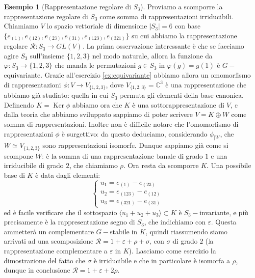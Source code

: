 \documentclass[11pt]{article}
\theoremstyle{plain}
\theoremstyle{definition}
\newtheorem{exmp}{Esempio}[section]
\theoremstyle{remark}
\newcommand{\C}{\mathbb{C}}
\DeclareMathOperator{\Ker}{Ker}
\DeclareMathOperator{\iso}{\simeq}
\begin{document}
\begin{exmp}[Rappresentazione regolare di $S_3$]
Proviamo a scomporre la rappresentazione regolare di $S_3$ come somma di rappresentazioni irriducibili.
Chiamiamo $V$ lo spazio vettoriale di dimensione $|S_3|=6$ con base $\{e_{(1)}, e_{(12)}, e_{(23)}, e_{(31)}, e_{(123)}, e_{(321)}\}$
su cui abbiamo la rappresentazione regolare $\mathcal{R}:S_3\to GL(V)$.\newline
La prima osservazione interessante è che se facciamo agire $S_3$ sull'insieme $\{1,2,3\}$ nel modo naturale, allora la funzione 
da $\varphi:S_3\to\{1,2,3\}$ che manda le permutazioni $g\in S_3$ in $\varphi(g) = g(1)$ è $G-$equivariante.
Grazie all'esercizio \ref{ex:equivariante} abbiamo allora un omomorfismo di rappresentazioni $\phi:V\to V_{\{1,2,3\}}$,
dove $V_{\{1,2,3\}} = \C^3$ è una rappresentazione che abbiamo già studiato: quella in cui $S_3$ permuta gli elementi della base canonica.\newline
Definendo $K = \Ker\phi$ abbiamo ora che $K$ è una sottorappresentazione di $V$, e dalla teoria che abbiamo sviluppato sappiamo di poter scrivere
$V = K\oplus W$ come somma di rappresentazioni. Inoltre non è difficile notare che l'omomorfismo di rappresentazioni $\phi$ è surgettivo:
da questo deduciamo, considerando $\phi_{|W}$, che $W\iso V_{\{1,2,3\}}$ sono rappresentazioni isomorfe. Dunque sappiamo già come si scompone $W$:
è la somma di una rappresentazione banale di grado $1$ e una irriducibile di grado $2$, che chiamiamo $\rho$.\newline
Ora resta da scomporre $K$. Una possibile base di $K$ è data dagli elementi:
\[\begin{cases}
u_1 = e_{(1)} - e_{(23)}\\
u_2 = e_{(123)} - e_{(12)}\\
u_3 = e_{(321)} - e_{(31)}
\end{cases}\]
ed è facile verificare che il sottospazio $\langle u_1+u_2+u_3\rangle\subset K$ è $S_3-$invariante, e più precisamente è la rappresentazione
segno di $S_3$, che indichiamo con $\varepsilon$. Questa ammetterà un complementare $G-$stabile in $K$, quindi riassumendo siamo arrivati ad una scomposizione
$\mathcal{R} = 1 + \varepsilon + \rho + \sigma$, con $\sigma$ di grado $2$ (la rappresentazione complementare a $\varepsilon$ in $K$).
Lasciamo come esercizio la dimostrazione del fatto che $\sigma$ è irriducibile e che in particolare è isomorfa a $\rho$, dunque in conclusione
$\mathcal{R} = 1 + \varepsilon + 2\rho$.
\end{exmp}
\end{document}
